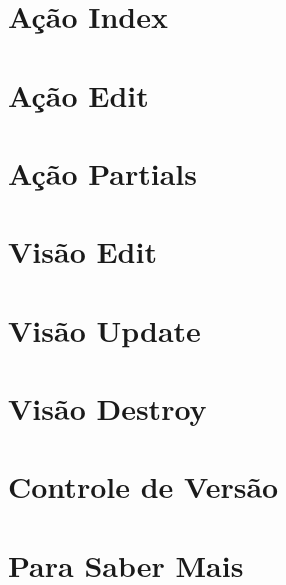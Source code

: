 \documentclass[t, 				             
			   final,
			   12pt, 				         
			   xcolor={usenames,dvipsnames}, 
			   table]{beamer}
\begin{document}
	
	
	  	

    \section{Ação Index}
	
    \section{Ação Edit}
	
    \section{Ação Partials}
	
    \section{Visão Edit}
	
    \section{Visão Update}
	
    \section{Visão Destroy}
	
    \section{Controle de Versão}
	
    
    \section{Para Saber Mais}
	
\end{document}
